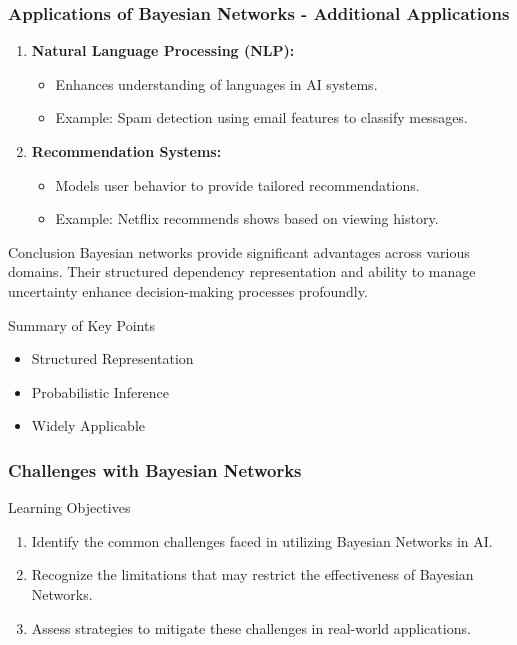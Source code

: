 \documentclass[aspectratio=169]{beamer}
\begin{document}
\begin{frame}[fragile]
    \frametitle{Applications of Bayesian Networks - Additional Applications}
    \begin{enumerate}[resume]
        \item \textbf{Natural Language Processing (NLP):}
        \begin{itemize}
            \item Enhances understanding of languages in AI systems.
            \item Example: Spam detection using email features to classify messages.
        \end{itemize}
        
        \item \textbf{Recommendation Systems:}
        \begin{itemize}
            \item Models user behavior to provide tailored recommendations.
            \item Example: Netflix recommends shows based on viewing history.
        \end{itemize}
    \end{enumerate}
    
    \begin{block}{Conclusion}
        Bayesian networks provide significant advantages across various domains. Their structured dependency representation and ability to manage uncertainty enhance decision-making processes profoundly.
    \end{block}
    
    \begin{block}{Summary of Key Points}
        \begin{itemize}
            \item Structured Representation
            \item Probabilistic Inference
            \item Widely Applicable
        \end{itemize}
    \end{block}
\end{frame}

\begin{frame}[fragile]
    \frametitle{Challenges with Bayesian Networks}
    \begin{block}{Learning Objectives}
        \begin{enumerate}
            \item Identify the common challenges faced in utilizing Bayesian Networks in AI.
            \item Recognize the limitations that may restrict the effectiveness of Bayesian Networks.
            \item Assess strategies to mitigate these challenges in real-world applications.
        \end{enumerate}
    \end{block}
\end{frame}
\end{document}
